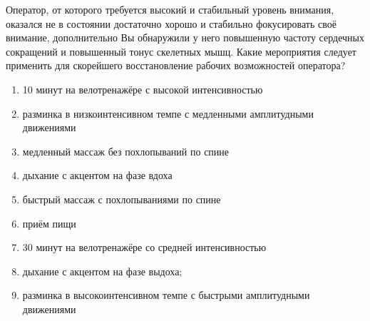 
Оператор, от которого требуется высокий и стабильный уровень внимания, оказался не в состоянии достаточно хорошо и стабильно фокусировать своё внимание, дополнительно Вы обнаружили у него повышенную частоту сердечных сокращений и повышенный тонус скелетных мышц. Какие мероприятия следует применить для скорейшего восстановление рабочих возможностей оператора?

\begin{enumerate}
    \item 10 минут на велотренажёре с высокой интенсивностью
    \item разминка в низкоинтенсивном темпе с медленными амплитудными движениями
    \item медленный массаж без похлопываний по спине
    \item дыхание с акцентом на фазе вдоха
    \item быстрый массаж с похлопываниями по спине
    \item приём пищи
    \item 30 минут на велотренажёре со средней интенсивностью
    \item дыхание с акцентом на фазе выдоха;
    \item разминка в высокоинтенсивном темпе с быстрыми амплитудными движениями
\end{enumerate}